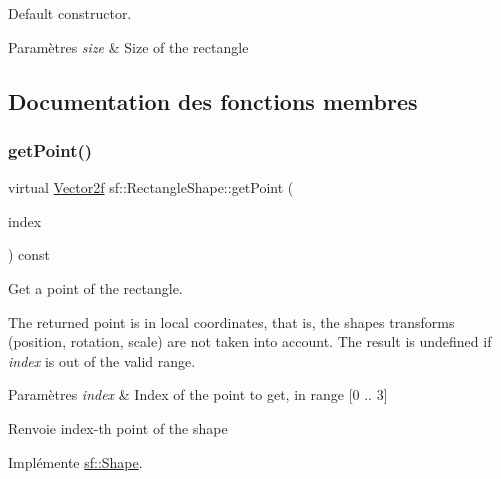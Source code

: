 Default constructor. 


\begin{DoxyParams}{Paramètres}
{\em size} & Size of the rectangle \\
\hline
\end{DoxyParams}


\subsection{Documentation des fonctions membres}
\mbox{\label{classsf_1_1RectangleShape_a3909f1a1946930ff5ae17c26206c0f81}} 
\subsubsection{\texorpdfstring{get\+Point()}{getPoint()}}
{\footnotesize\ttfamily virtual \hyperlink{classsf_1_1Vector2}{Vector2f} sf\+::\+Rectangle\+Shape\+::get\+Point (\begin{DoxyParamCaption}\item[{std\+::size\+\_\+t}]{index }\end{DoxyParamCaption}) const\hspace{0.3cm}{\ttfamily [virtual]}}



Get a point of the rectangle. 

The returned point is in local coordinates, that is, the shape\textquotesingle{}s transforms (position, rotation, scale) are not taken into account. The result is undefined if {\itshape index} is out of the valid range.


\begin{DoxyParams}{Paramètres}
{\em index} & Index of the point to get, in range \mbox{[}0 .. 3\mbox{]}\\
\hline
\end{DoxyParams}
\begin{DoxyReturn}{Renvoie}
index-\/th point of the shape 
\end{DoxyReturn}


Implémente \hyperlink{classsf_1_1Shape_a40e5d83713eb9f0c999944cf96458085}{sf\+::\+Shape}.

\mbox{\label{classsf_1_1RectangleShape_adfb2f429e5720c9ccdb26d5996c3ae33}} 
